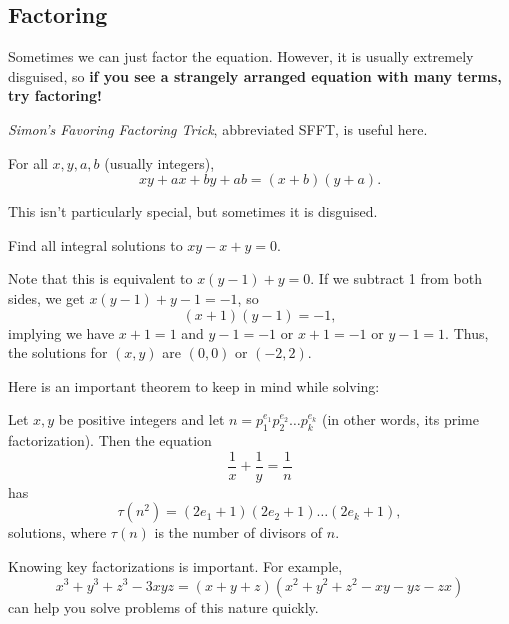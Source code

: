 \documentclass[mast]{lucky}
\begin{document}
\subsection{Factoring}
Sometimes we can just factor the equation. However, it is usually extremely disguised, so \textbf{if you see a strangely arranged equation with many terms, try factoring!}

\emph{Simon's Favoring Factoring Trick}, abbreviated SFFT, is useful here.
\begin{theo}[SFFT]
For all $x,y,a,b$ (usually integers),
$$xy+ax+by+ab=(x+b)(y+a).$$
\end{theo}
This isn't particularly special, but sometimes it is disguised.
\begin{exam}
Find all integral solutions to $xy-x+y=0$.
\end{exam}
\begin{sol}
Note that this is equivalent to $x(y-1)+y=0$. If we subtract 1 from both sides, we get $x(y-1)+y-1=-1$, so
$$(x+1)(y-1)=-1,$$
implying we have $x+1=1$ and $y-1=-1$ or $x+1=-1$ or $y-1=1$. Thus, the solutions for $(x,y)$ are $\boxed{(0,0)}$ or $\boxed{(-2,2)}$.
\end{sol}
Here is an important theorem to keep in mind while solving:
\begin{theo}
Let $x,y$ be positive integers and let $n=p_1^{e_1}p_2^{e_2}\ldots p_k^{e_k}$ (in other words, its prime factorization). Then the equation
$$\frac{1}{x}+\frac{1}{y}=\frac{1}{n}$$
has
$$\tau(n^2) = (2e_1+1)(2e_2+1)\ldots(2e_k+1),$$
solutions, where $\tau(n)$ is the number of divisors of $n$.
\end{theo}
Knowing key factorizations is important. For example,
$$x^3+y^3+z^3-3xyz=(x+y+z)(x^2+y^2+z^2-xy-yz-zx)$$
can help you solve problems of this nature quickly.
\end{document}
